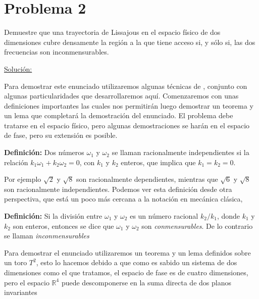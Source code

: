 \documentclass[a4paper,10pt]{article}
\numberwithin{equation}{section}
\newcommand{\definicion}{\textbf{Definición: }}
\begin{document}
\section{Problema 2}

Demuestre que una trayectoria de Lissajous en el espacio físico de dos 
dimensiones cubre densamente la región a la que tiene acceso si, y sólo si,
las dos frecuencias son inconmensurables.

\vspace{.3cm}

\underline{Solución:} \vspace{.3cm}

Para demostrar este enunciado utilizaremos algunas técnicas de \cite{arnold}, conjunto
con algunas particularidades que desarrollaremos aquí. Comenzaremos con unas definiciones 
importantes las cuales nos permitirán luego demostrar un teorema y un lema que completará
la demostración del enunciado. El problema debe tratarse en el espacio físico, pero 
algunas demostraciones se harán en el espacio de fase, pero su extensión es 
posible.

\vspace{.3cm}

\definicion Dos números $\omega_1$ y $\omega_2$ se llaman racionalmente independientes si la 
relación $k_1\omega_1 + k_2\omega_2 = 0$, con $k_1$ y $k_2$ enteros, que implica que 
$k_1 = k_2 = 0$.

\vspace{.3cm}

Por ejemplo $\sqrt{2}$ y $\sqrt{8}$ son racionalmente dependientes, mientras que 
$\sqrt{6}$ y $\sqrt{8}$ son racionalmente independientes. Podemos ver esta definición
desde otra perspectiva, que está un poco más cercana a la notación en mecánica clásica,

\vspace{.3cm}

\definicion Si la división entre $\omega_1$ y $\omega_2$ es un número 
racional $k_2/k_1$, donde $k_1$ y $k_2$ son enteros, entonces se dice que $\omega_1$ y
$\omega_2$ son \emph{conmensurables}. De lo contrario se llaman \emph{inconmensurables}

\vspace{.3cm}

Para demostrar el enunciado utilizaremos un teorema y un lema definidos sobre un 
toro $T^2$, esto lo hacemos debido a que como es sabido un sistema de dos dimensiones 
como el que tratamos, el espacio de fase es de cuatro dimensiones, pero el espacio $\mathbb{R}^4$
puede descomponerse en la suma directa de dos planos invariantes 
\end{document}
